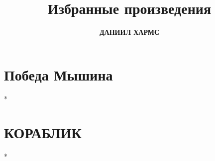 \documentclass[a4paper,12pt]{article}
\title{Избранные произведения}
\author{\huge \textbf{ДАНИИЛ ХАРМС}}
\date{}
\begin{document}
	\maketitle
	\vspace{0.1cm}
	\section*{Победа Мышина}
	
	
	\begin{center}
		* \quad * \quad *
	\end{center}
	
	\section*{КОРАБЛИК}
	
	
	\begin{center}
		* \quad * \quad *
	\end{center}
	
	\section*{}
	
	
\end{document}
